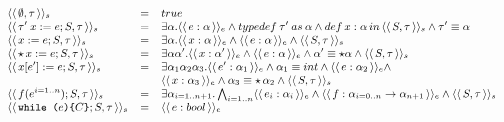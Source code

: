\documentclass[a4paper,8pt]{article}
\newcommand{\constre}[1]{\ensuremath{\langle\langle\,#1\,\rangle\rangle_{e}}}
\newcommand{\constrc}[1]{\ensuremath{\langle\langle\,#1\,\rangle\rangle_{s}}}
\begin{document}
     \begin{figure}[h]
       \[
          \small{
           \begin{array}{lcl}
               \constrc{\emptyset, \tau} & = & true \\
               \constrc{\tau'\:x := e; S, \tau} & = & \exists \alpha. \constre{e : \alpha} \land
                                              typedef\:\tau' \: as \:
                                                     \alpha \land
                                              def\,x:\alpha\,in\,\constrc{S
                                                     , \tau}
             \land \tau' \equiv \alpha\\
               \constrc{x := e ; S, \tau} & = & \exists \alpha. \constre{x : \alpha}\land\constre{e : \alpha} \land
                                                      \constrc{S , \tau}\\ 
               \constrc{\star\,x := e ; S, \tau} & = & \exists \alpha \alpha'. \constre{x : \alpha'}\land\constre{e : \alpha} \land
                                                      \alpha' \equiv
                                                \star
                                                      \alpha\land\constrc{S
                                                      , \tau}\\ 
               \constrc{x[e'] := e ; S , \tau} & = &
                                             \exists\alpha_1\alpha_2\alpha_3.\constre{e'
                                             : \alpha_1}\land \alpha_1
                                             \equiv int \land \constre{e :
                                             \alpha_2} \land \\ 
                       & & \constre{x : \alpha_3} \land
                           \alpha_3 \equiv \star\,\alpha_2 \land
                           \constrc{S , \tau}\\
               \constrc{f(e^{i=1..n}) ; S , \tau} & = & \exists
                                            \alpha_{i=1..n +1}.\bigwedge_{i
                                            = 1..n}\constre{e_i :
                                            \alpha_i} \land \constre{f
                                            : \alpha_{i = 0.. n} \to
                                            \alpha_{n + 1}} \land
                                                \constrc{S , \tau}\\
               \constrc{\texttt{while (} e
             \texttt{)\{}C\texttt{\}} ; S , \tau} &= & \constre{e : bool}

\end{array}}\]
\end{figure}
\end{document}

